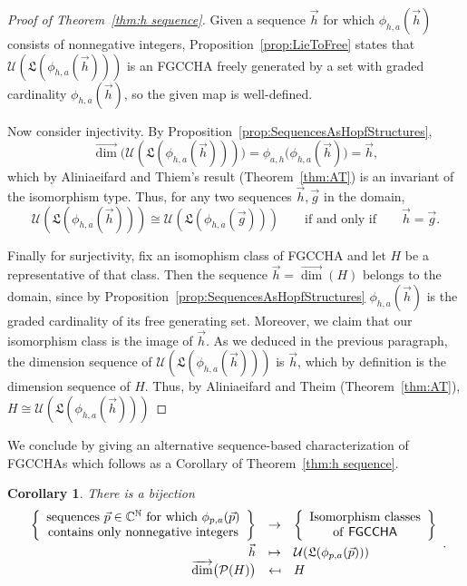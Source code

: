 \documentclass[11pt]{amsart}
\newtheorem{corollary}[theorem]{Corollary}
\theoremstyle{definition}
\numberwithin{equation}{section}
\def\NN{{\mathbb N}}
\def\CC{{\mathbb C}}
\newcommand{\FGCCHA}{\textsf{FGCCHA}\xspace}
\newcommand{\FGCCHAs}{\textsf{FGCCHA}s\xspace}
\newcommand{\vecdim}{\overrightarrow{\dim}}
\begin{document}
\begin{proof}[Proof of Theorem~\ref{thm:h sequence}]
Given a sequence $\vec{h}$ for which $\phi_{h, a}(\vec{h})$ consists of nonnegative integers, Proposition~\ref{prop:LieToFree} states that $\mathcal{U}(\mathfrak{L}(\phi_{h, a}(\vec{h})))$ is an \FGCCHA freely generated by a set with graded cardinality $\phi_{h, a}(\vec{h})$, so the given map is well-defined.  

Now consider injectivity.  By Proposition~\ref{prop:SequencesAsHopfStructures},
\[
\vecdim\big(\mathcal{U}(\mathfrak{L}(\phi_{h, a}(\vec{h})))\big) = \phi_{a, h}\big(\phi_{h, a}(\vec{h})) = \vec{h},
\]
which by Aliniaeifard and Thiem's result (Theorem~\ref{thm:AT}) is an invariant of the isomorphism type.  Thus, for any two sequences $\vec{h}, \vec{g}$ in the domain, 
\[
\mathcal{U}(\mathfrak{L}(\phi_{h, a}(\vec{h}))) \cong \mathcal{U}(\mathfrak{L}(\phi_{h, a}(\vec{g})))
\qquad\text{if and only if}\qquad
\vec{h} = \vec{g}.
\]

Finally for surjectivity, fix an isomophism class of \FGCCHA and let $H$ be a representative of that class.  Then the sequence $\vec{h} = \vecdim(H)$ belongs to the domain, since by  Proposition~\ref{prop:SequencesAsHopfStructures} $\phi_{h, a}(\vec{h})$ is the graded cardinality of its free generating set.  
Moreover, we claim that our isomorphism class is the image of $\vec{h}$.  
As we deduced in the previous paragraph, the dimension sequence of $\mathcal{U}(\mathfrak{L}(\phi_{h, a}(\vec{h})))$ is $\vec{h}$, which by definition is the dimension sequence of $H$.  
Thus, by Aliniaeifard and Theim (Theorem~\ref{thm:AT}), $H \cong \mathcal{U}(\mathfrak{L}(\phi_{h, a}(\vec{h})))$
\end{proof}

We conclude by giving an alternative sequence-based characterization of \FGCCHAs which follows as a Corollary of Theorem~\ref{thm:h sequence}.


\begin{corollary}
\label{prop:UniqueBySequence}
There is a bijection
\[
\begin{array}{rcl}
\left\{ \begin{array}{c} \text{sequences $\vec{p} \in \CC^{\NN}$ for which $\phi_{p,a}(\vec{p})$} \\ \text{contains only nonnegative integers} \end{array} \right\} & \to & \left\{ \begin{array}{c} \text{Isomorphism classes} \\ \text{of \FGCCHA} \end{array} \right\} \\[2ex]
\vec{h} & \mapsto & \mathcal{U}(\mathfrak{L}(\phi_{p,a}(\vec{p}))) \\
\vecdim\big(\mathcal{P}(H)\big) & \mapsfrom & H
\end{array}.
\]
\end{corollary}
\end{document}
